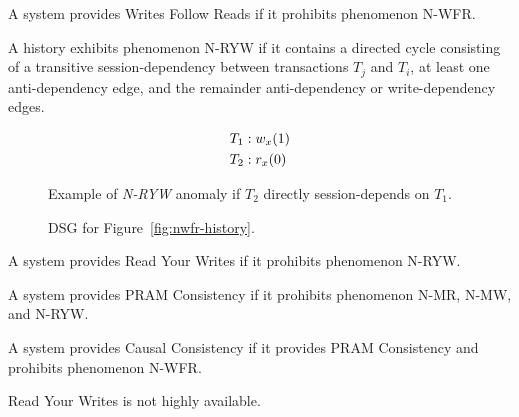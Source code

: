 \begin{definition}
A system provides Writes Follow Reads if it prohibits phenomenon N-WFR.
\end{definition}

\begin{definition}
A history exhibits phenomenon N-RYW if it contains a directed cycle
consisting of a transitive session-dependency between transactions
$T_j$ and $T_i$, at least one anti-dependency edge, and the remainder
anti-dependency or write-dependency edges.
\end{definition}


\begin{figure}[H]
\begin{align*}
\small
T_1 &: w_x(1)\\
T_2 &: r_x(0)\\
\end{align*}
\caption{Example of \textit{N-RYW} anomaly if $T_2$ directly session-depends on $T_1$.}
\label{fig:nryw-history}
\end{figure}

\begin{figure}[H]
\centering
{}
\caption{DSG for Figure~\ref{fig:nwfr-history}.}
\label{fig:nryw-dsg}
\end{figure}

\begin{definition}
A system provides Read Your Writes if it prohibits phenomenon N-RYW.
\end{definition}

\begin{definition}
A system provides PRAM Consistency if it prohibits phenomenon N-MR,
N-MW, and N-RYW.
\end{definition}

\begin{definition}
A system provides Causal Consistency if it provides PRAM Consistency
and prohibits phenomenon N-WFR.
\end{definition}


\begin{observation}
Read Your Writes is not highly available.
\end{observation}

